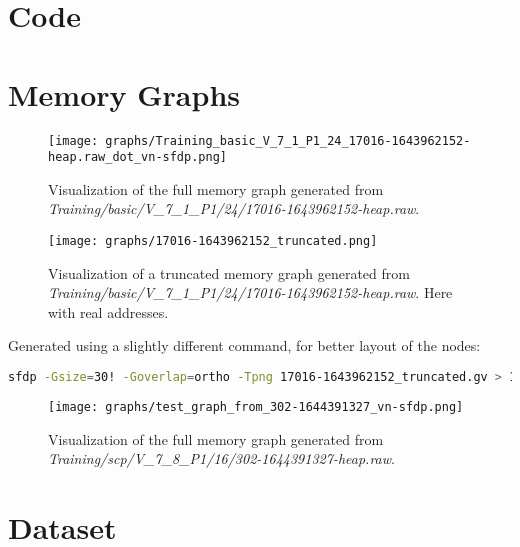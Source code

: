 \section{Code}

\section{Memory Graphs}

\begin{figure}[H]\label{appendix:mem_graph:17016-1643962152:full}
    \centering
    \texttt{[image: graphs/Training\_basic\_V\_7\_1\_P1\_24\_17016-1643962152-heap.raw\_dot\_vn-sfdp.png]}
    \caption{Visualization of the full memory graph generated from \textit{Training/basic/V\_7\_1\_P1/24/17016-1643962152-heap.raw}.}
\end{figure}

\begin{figure}[H]\label{appendix:mem_graph:17016-1643962152:truncated}
    \centering
    \texttt{[image: graphs/17016-1643962152\_truncated.png]}
    \caption{Visualization of a truncated memory graph generated from \textit{Training/basic/V\_7\_1\_P1/24/17016-1643962152-heap.raw}. Here with real addresses.}
\end{figure}

Generated using a slightly different command, for better layout of the nodes:

\begin{lstlisting}[language=bash, caption={Command used to generate the memory graph visualization of \textit{Training/basic/V\_7\_1\_P1/24/17016-1643962152-heap.raw} here using real addresses.}]
    sfdp -Gsize=30! -Goverlap=ortho -Tpng 17016-1643962152_truncated.gv > 17016-1643962152_truncated.png
\end{lstlisting}

\begin{figure}[H]\label{appendix:mem_graph:302-1644391327:full}
    \centering
    \texttt{[image: graphs/test\_graph\_from\_302-1644391327\_vn-sfdp.png]}
    \caption{Visualization of the full memory graph generated from \textit{Training/scp/V\_7\_8\_P1/16/302-1644391327-heap.raw}.}
\end{figure}

\section{Dataset}